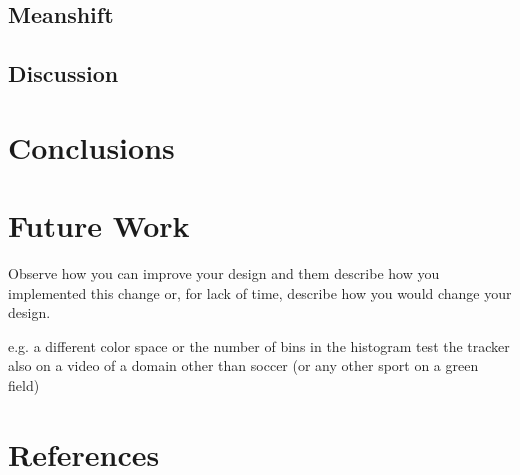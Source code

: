 \documentclass[a4paper,11pt]{article}
\begin{document}
	\subsection{Meanshift} 
\subsection{Discussion} %


\section{Conclusions} \label{sec:conc}
\section{Future Work} \label{sec:fut}
Observe how you can improve your design and them describe how you implemented this change or, for lack of time, describe how you would change your design. 

e.g. a different color space or the number of bins in the histogram
test the tracker also on a video of a domain other than soccer (or any other sport on a green field)

\section{References} 


% 
% 
\end{document}
